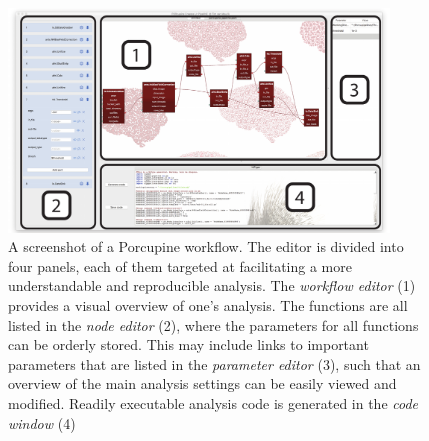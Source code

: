 \begin{figure}[!ht]
	\centering
	\includegraphics[width=0.9\textwidth, clip=true]{./Chapters/05_Porcupine/./Images/gui_showcase.pdf}
	\caption{A screenshot of a Porcupine workflow. The editor is divided into four panels, each of them targeted at facilitating a more understandable and reproducible analysis. The \emph{workflow editor} (1) provides a visual overview of one's analysis. The functions are all listed in the \emph{node editor} (2), where the parameters for all functions can be orderly stored. This may include links to important parameters that are listed in the \emph{parameter editor} (3), such that an overview of the main analysis settings can be easily viewed and modified. Readily executable analysis code is generated in the \emph{code window} (4)}
	\label{fig:porcupine-editor}
\end{figure}